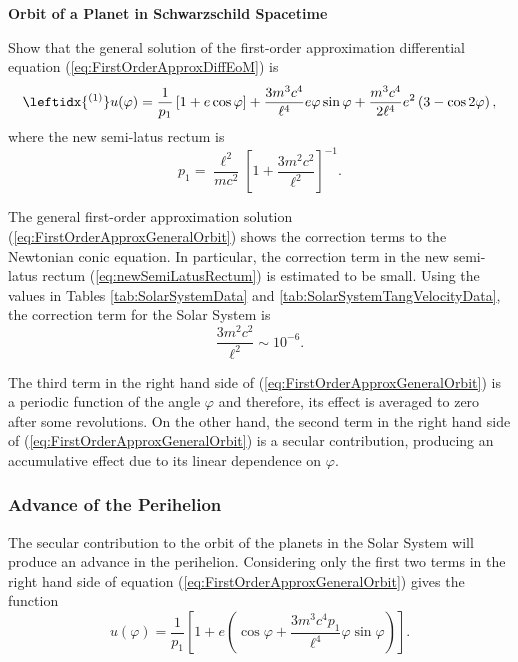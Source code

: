 \begin{exercise}
\textbf{Orbit of a Planet in Schwarzschild Spacetime}

Show that the general solution of the first-order approximation differential equation (\ref{eq:FirstOrderApproxDiffEoM}) is
\begin{equation}
\leftidx{^{(1)}} u (\varphi) = \frac{1}{ p_1  } \left[ 1+ e \cos \varphi \right] + \frac{3m^3 c^4}{\ell^4} e \varphi \sin \varphi + \frac{m^3 c^4}{2 \ell ^4} e^2\left( 3 - \cos 2\varphi \right), \label{eq:FirstOrderApproxGeneralOrbit}
\end{equation}
where the new semi-latus rectum is
\begin{equation}
p_1 = \frac{\ell^2}{mc^2}  \left[ 1 + \frac{3m^2 c^2}{\ell^2}  \right]^{-1}. \label{eq:newSemiLatusRectum}
\end{equation}
\end{exercise}

The general first-order approximation solution (\ref{eq:FirstOrderApproxGeneralOrbit}) shows the correction terms to the Newtonian conic equation. In particular, the correction term in the new semi-latus rectum (\ref{eq:newSemiLatusRectum}) is estimated to be small. Using the values in Tables \ref{tab:SolarSystemData} and \ref{tab:SolarSystemTangVelocityData}, the correction term for the Solar System is
\begin{equation}
\frac{3m^2 c^2}{\ell^2} \sim 10^{-6}.
\end{equation}

The third term in the right hand side of (\ref{eq:FirstOrderApproxGeneralOrbit}) is a periodic function of the angle $\varphi$ and therefore, its effect is averaged to zero after some revolutions. On the other hand, the second term in the right hand side of (\ref{eq:FirstOrderApproxGeneralOrbit}) is a secular contribution, producing an accumulative effect due to its linear dependence on $\varphi$. 

\subsubsection{Advance of the Perihelion}\label{sec:PerihelionSchwarzschild}

The secular contribution to the orbit of the planets in the Solar System will produce an advance in the perihelion. Considering only the first two terms in the right hand side of equation (\ref{eq:FirstOrderApproxGeneralOrbit}) gives the function
\begin{equation}
u(\varphi) = \frac{1}{ p_1  } \left[ 1+ e \left( \cos \varphi + \frac{3m^3 c^4 p_1}{\ell^4}  \varphi \sin \varphi \right) \right]. 
\end{equation}

